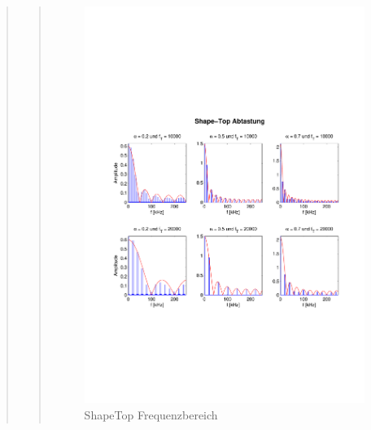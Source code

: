 \begin{quote}
\begin{quote}
        
        \begin{figure}[H]
            \centering
            \hspace{-3em}
            \includegraphics[scale=0.8, trim = 2cm 7cm 1cm 8cm, clip]{Bilder/ShapeTop_freq}
            \caption{ShapeTop Frequenzbereich}
            \label{fig:ShapeTop_freq}
        \end{figure}
        
        
    \end{quote}
    
    
\end{quote}



